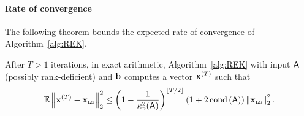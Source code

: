 \paragraph{Rate of convergence}
%
The following theorem bounds the expected rate of convergence of Algorithm~\ref{alg:REK}.
%
%
\begin{theorem}\label{thm:REK}
After $T>1$ iterations, in exact arithmetic, Algorithm~\ref{alg:REK} with input ${\mathsf{A} }$ (possibly rank-deficient) and ${\mathbf b}$ computes a vector $\mathbf{x}^{(T)}$ such that
%
%
\[ \operatorname{\mathbb{E}} \left\|\mathbf{x}^{(T)} - \mathbf{x}_{\textrm{\tiny LS}}\right\|_2^2 \leq \left(1 - \frac1{\kappa^2_{\textrm{\tiny F}}({\mathsf{A} })}\right)^{\lfloor T/2\rfloor}\left(1 + 2\operatorname{\mathrm{cond}}\left({\mathsf{A} }\right)\right) \left\|\mathbf{x}_{\textrm{\tiny LS}}\right\|_2^2.\]
%
%
\end{theorem}
%
%
